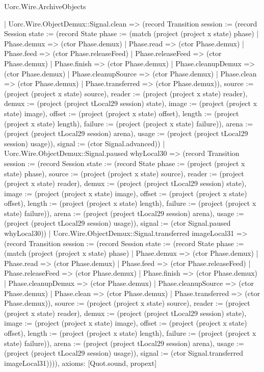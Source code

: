 \begin{lexlean}{Uorc.Wire.ArchiveObjects}
\begin{semanticmodule}
{    | Uorc.Wire.ObjectDemux::Signal.clean => (record Transition {session := (record Session {state := (record State {phase := (match (project (project x state) phase)
      | Phase.demux => (ctor Phase.demux)
      | Phase.read => (ctor Phase.demux)
      | Phase.feed => (ctor Phase.releaseFeed)
      | Phase.releaseFeed => (ctor Phase.demux)
      | Phase.finish => (ctor Phase.demux)
      | Phase.cleanupDemux => (ctor Phase.demux)
      | Phase.cleanupSource => (ctor Phase.demux)
      | Phase.clean => (ctor Phase.demux)
      | Phase.transferred => (ctor Phase.demux)), source := (project (project x state) source), reader := (project (project x state) reader), demux := (project (project tLocal29 session) state), image := (project (project x state) image), offset := (project (project x state) offset), length := (project (project x state) length), failure := (project (project x state) failure)}), arena := (project (project tLocal29 session) arena), usage := (project (project tLocal29 session) usage)}), signal := (ctor Signal.advanced)})
    | Uorc.Wire.ObjectDemux::Signal.paused whyLocal30 => (record Transition {session := (record Session {state := (record State {phase := (project (project x state) phase), source := (project (project x state) source), reader := (project (project x state) reader), demux := (project (project tLocal29 session) state), image := (project (project x state) image), offset := (project (project x state) offset), length := (project (project x state) length), failure := (project (project x state) failure)}), arena := (project (project tLocal29 session) arena), usage := (project (project tLocal29 session) usage)}), signal := (ctor Signal.paused whyLocal30)})
    | Uorc.Wire.ObjectDemux::Signal.transferred imageLocal31 => (record Transition {session := (record Session {state := (record State {phase := (match (project (project x state) phase)
      | Phase.demux => (ctor Phase.demux)
      | Phase.read => (ctor Phase.demux)
      | Phase.feed => (ctor Phase.releaseFeed)
      | Phase.releaseFeed => (ctor Phase.demux)
      | Phase.finish => (ctor Phase.demux)
      | Phase.cleanupDemux => (ctor Phase.demux)
      | Phase.cleanupSource => (ctor Phase.demux)
      | Phase.clean => (ctor Phase.demux)
      | Phase.transferred => (ctor Phase.demux)), source := (project (project x state) source), reader := (project (project x state) reader), demux := (project (project tLocal29 session) state), image := (project (project x state) image), offset := (project (project x state) offset), length := (project (project x state) length), failure := (project (project x state) failure)}), arena := (project (project tLocal29 session) arena), usage := (project (project tLocal29 session) usage)}), signal := (ctor Signal.transferred imageLocal31)}))),
  axioms: [Quot.sound, propext]
}


\end{semanticmodule}
\end{lexlean}
